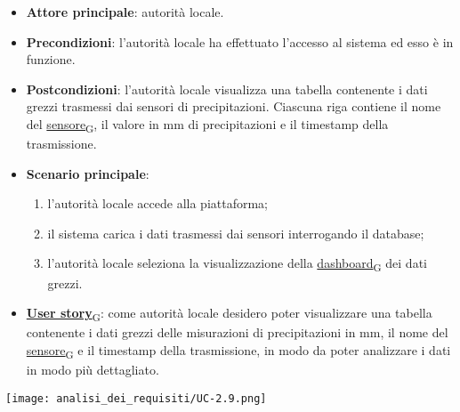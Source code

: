 \newpage
{}
\begin{itemize}
	\item \textbf{Attore principale}: autorità locale.
	\item \textbf{Precondizioni}: l'autorità locale ha effettuato l'accesso al sistema ed esso è in funzione.
	\item \textbf{Postcondizioni}: l'autorità locale visualizza una tabella contenente i dati grezzi trasmessi dai sensori di precipitazioni.
	      Ciascuna riga contiene il nome del \href{https://7last.github.io/docs/pb/documentazione-interna/glossario\#sensore}{sensore\textsubscript{G}}, il valore in mm di precipitazioni e il timestamp della trasmissione.
	\item \textbf{Scenario principale}:
	      \begin{enumerate}
		      \item l'autorità locale accede alla piattaforma;
		      \item il sistema carica i dati trasmessi dai sensori interrogando il database;
		      \item l'autorità locale seleziona la visualizzazione della \href{https://7last.github.io/docs/pb/documentazione-interna/glossario\#dashboard}{dashboard\textsubscript{G}} dei dati grezzi.
	      \end{enumerate}
	\item \href{https://7last.github.io/docs/pb/documentazione-interna/glossario\#user-story}{\textbf{User story}\textsubscript{G}}:
	      come autorità locale desidero poter visualizzare una tabella contenente i dati grezzi delle misurazioni di precipitazioni in mm,
	      il nome del \href{https://7last.github.io/docs/pb/documentazione-interna/glossario\#sensore}{sensore\textsubscript{G}} e il timestamp della trasmissione, in modo da poter analizzare i dati in modo più dettagliato.
\end{itemize}
\begin{center}
	\texttt{[image: analisi\_dei\_requisiti/UC-2.9.png]}
\end{center}

